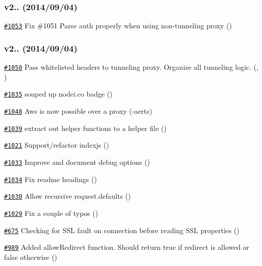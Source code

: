 \subsubsection*{v2.. (2014/09/04)}


\begin{DoxyItemize}
\item \href{https://github.com/request/request/pull/1053}{\tt \#1053} Fix \#1051 Parse auth properly when using non-\/tunneling proxy ()
\end{DoxyItemize}

\subsubsection*{v2.. (2014/09/04)}


\begin{DoxyItemize}
\item \href{https://github.com/request/request/pull/1050}{\tt \#1050} Pass whitelisted headers to tunneling proxy. Organize all tunneling logic. (, )
\item \href{https://github.com/request/request/pull/1035}{\tt \#1035} souped up nodei.\+co badge ()
\item \href{https://github.com/request/request/pull/1048}{\tt \#1048} Aws is now possible over a proxy (-\/aerts)
\item \href{https://github.com/request/request/pull/1039}{\tt \#1039} extract out helper functions to a helper file ()
\item \href{https://github.com/request/request/pull/1021}{\tt \#1021} Support/refactor indexjs ()
\item \href{https://github.com/request/request/pull/1033}{\tt \#1033} Improve and document debug options ()
\item \href{https://github.com/request/request/pull/1034}{\tt \#1034} Fix readme headings ()
\item \href{https://github.com/request/request/pull/1030}{\tt \#1030} Allow recursive request.\+defaults ()
\item \href{https://github.com/request/request/pull/1029}{\tt \#1029} Fix a couple of typos ()
\item \href{https://github.com/request/request/pull/675}{\tt \#675} Checking for S\+SL fault on connection before reading S\+SL properties ()
\item \href{https://github.com/request/request/pull/989}{\tt \#989} Added allow\+Redirect function. Should return true if redirect is allowed or false otherwise ()

\end{DoxyItemize}
